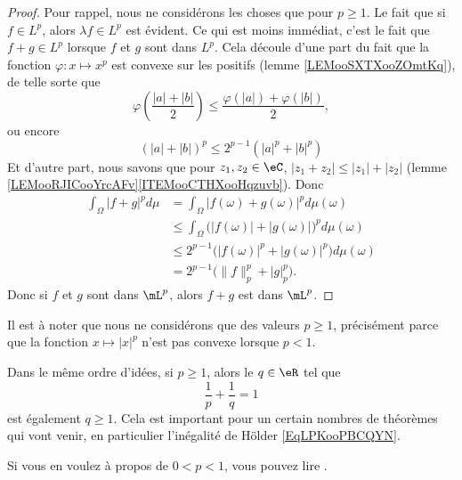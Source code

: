 \begin{proof}
    Pour rappel, nous ne considérons les choses que pour \( p\geq 1\). Le fait que si \( f\in L^p\), alors \( \lambda f\in L^p\) est évident. Ce qui est moins immédiat, c'est le fait que \( f+g\in L^p\) lorsque \( f\) et \( g\) sont dans \( L^p\). Cela découle d'une part du fait que la fonction \( \varphi\colon x\mapsto x^p\) est convexe sur les positifs (lemme \ref{LEMooSXTXooZOmtKq}), de telle sorte que
    \begin{equation}
        \varphi\left( \frac{ |a|+|b| }{2} \right)\leq\frac{ \varphi(|a|)+\varphi(|b|) }{2},
    \end{equation}
    ou encore
    \begin{equation}    \label{EqZFSduFa}
        (|a|+|b|)^p\leq 2^{p-1}(|a|^p+|b|^p)
    \end{equation}
    Et d'autre part, nous savons que pour \( z_1,z_2\in \eC\), \( | z_1+z_2 |\leq | z_1 |+| z_2 |\) (lemme \ref{LEMooRJICooYrcAFv}\ref{ITEMooCTHXooHqzuvb}). Donc
    \begin{subequations}        \label{EQooKRMEooSLHUUc}
        \begin{align}
            \int_{\Omega}| f+g |^pd\mu&=\int_{\Omega}| f(\omega)+g(\omega) |^pd\mu(\omega)\\
            &\leq \int_{\Omega}\big( | f(\omega) |+| g(\omega) | \big)^pd\mu(\omega)\\
            &\leq 2^{p-1}\big( | f(\omega) |^p+| g(\omega) |^p \big)d\mu(\omega)\\
            &=2^{p-1}\big( \| f \|_p^p+| g |_p^p \big).
        \end{align}
    \end{subequations}
    Donc si \( f\) et \( g\) sont dans \( \mL^p\), alors \( f+g\) est dans \( \mL^p\).
\end{proof}

\begin{normaltext}
    Il est à noter que nous ne considérons que des valeurs \( p\geq 1\), précisément parce que la fonction \( x\mapsto | x |^p\) n'est pas convexe lorsque \( p<1\).

    Dans le même ordre d'idées, si \( p\geq 1\), alors le \( q\in \eR\) tel que
    \begin{equation}
        \frac{1}{ p }+\frac{1}{ q }=1
    \end{equation}
    est également \( q\geq 1\). Cela est important pour un certain nombres de théorèmes qui vont venir, en particulier l'inégalité de Hölder \eqref{EqLPKooPBCQYN}.

    Si vous en voulez à propos de \( 0<p<1\), vous pouvez lire \cite{ooECQXooZUqbSO}.
\end{normaltext}

